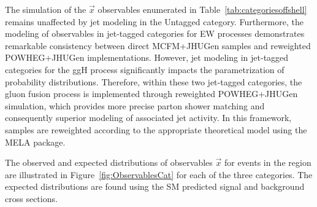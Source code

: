 The simulation of the $\vec{x}$ observables enumerated in Table~\ref{tab:categoriesoffshell} remains unaffected by jet modeling in the Untagged category. Furthermore, the modeling of observables in jet-tagged categories for EW processes demonstrates remarkable consistency between direct MCFM+JHUGen samples and reweighted POWHEG+JHUGen implementations. 
However, jet modeling in jet-tagged categories for the ggH process significantly impacts the parametrization of probability distributions. Therefore, within these two jet-tagged categories, the gluon fusion process is implemented through reweighted POWHEG+JHUGen simulation, which provides more precise parton shower matching and consequently superior modeling of associated jet activity. In this framework, samples are reweighted according to the appropriate theoretical model using the MELA package.

The observed and expected distributions of observables $\vec{x}$ for events in the \offshell region are illustrated in Figure~\ref{fig:ObservablesCat} for each of the three categories. The expected distributions are found using the SM predicted signal and background cross sections.

